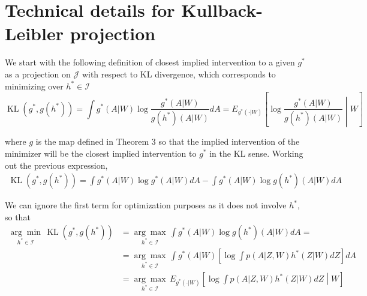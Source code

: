 \documentclass[12pt]{article}
\theoremstyle{thmstyleone}%
\theoremstyle{thmstyletwo}%
\theoremstyle{thmstylethree}%
\begin{document}
  




\section{Technical details for Kullback-Leibler projection}\label{EM-app}


We start with the following definition of closest implied intervention to a given $g^*$ as a projection on $\mathcal{J}$ with respect to KL divergence, which corresponds to minimizing over $h^* \in \mathcal{I}$ 
$$ \operatorname{K L}\left(g^*,g(h^*)\right) = \int g^*(A|W) \log \frac{g^*(A|W)}{g(h^*)(A|W)}dA = E_{g^*(\cdot |W)}\left[\log \frac{g^*(A|W)}{g(h^*)(A|W)} \middle| W\right]$$

where $g$ is the map defined in Theorem 3 so that the implied intervention of the minimizer will be the closest implied intervention to $g^*$ in the KL sense. Working out the previous expression, 
$$\begin{aligned}
	 \operatorname{K L}\left(g^*,g(h^*)\right)  =  \int g^*(A|W) \log{g^*(A|W)}dA -  \int g^*(A|W) \log{g(h^*)(A|W)}dA
	\end{aligned}$$
	
	We can ignore the first term for optimization purposes as it does not involve $h^*$, so that 
		$$\begin{aligned}
	\underset{h^* \in \mathcal{I}}{\arg \min} \,	\operatorname{K L}\left(g^*,g(h^*)\right)  &=  \underset{h^* \in \mathcal{I}}{\arg \max} \, \int g^*(A|W) \log{g(h^*)(A|W)}dA = \\ &=\underset{h^* \in \mathcal{I}}{\arg \max} \, \int g^*(A|W) \left[\log{\int p(A|Z,W) h^*(Z|W)}dZ\right]dA \\ &=\underset{h^* \in \mathcal{I}}{\arg \max} \, E_{g^*(\cdot |W)} \left[\log{\int p(A|Z,W) h^*(Z|W)}dZ \middle| W\right] 
	\end{aligned}$$
\end{document}
